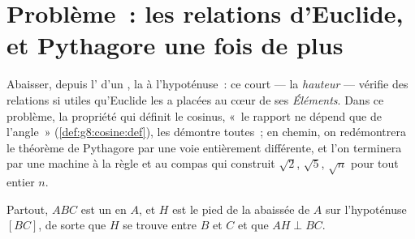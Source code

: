\section{Problème~: les relations d'Euclide, et Pythagore une fois de
plus}

\begin{problem}[{Devoir maison --- la hauteur d'un triangle
rectangle~: $AB^2 = BH \times BC$, $AH^2 = BH \times HC$, une seconde
démonstration de Pythagore, et une machine à construire des racines
carrées}]
\label{pb:g8:cosine:1}
Abaisser, depuis l' d'un , la
 à l'hypoténuse~: ce court  --- la
\emph{hauteur} --- vérifie des relations si utiles qu'Euclide les a
placées au cœur de ses \emph{Éléments}. Dans ce problème, la
propriété qui définit le cosinus, «~le rapport ne dépend que de
l'angle~» (\cref{def:g8:cosine:def}), les démontre toutes~; en
chemin, on redémontrera le théorème de Pythagore par une voie
entièrement différente, et l'on terminera par une machine à la règle
et au compas qui construit $\sqrt2$, $\sqrt5$, $\sqrt{n}$ pour tout
entier $n$.

Partout, $ABC$ est un  en $A$, et $H$ est le pied
de la  abaissée de $A$ sur l'hypoténuse $[BC]$, de
sorte que $H$ se trouve entre $B$ et $C$ et que $AH \perp BC$.


\end{problem}
